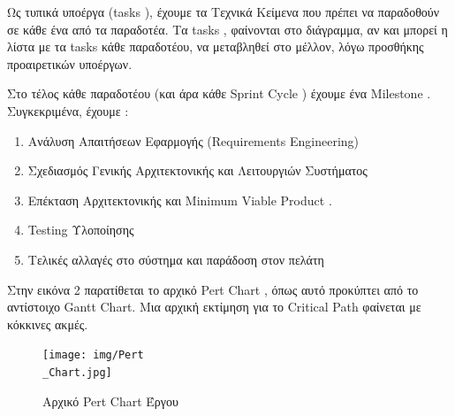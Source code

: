 \documentclass{../ol-softwaremanual}
\begin{document}
		Ως τυπικά υποέργα (\en tasks \gr), έχουμε τα Τεχνικά Κείμενα που πρέπει να παραδοθούν σε κάθε ένα από τα παραδοτέα. Τα \en tasks \gr, φαίνονται στο διάγραμμα, αν και μπορεί η λίστα με τα \en tasks \gr κάθε παραδοτέου, να μεταβληθεί στο μέλλον, λόγω προσθήκης προαιρετικών υποέργων. 
		
		Στο τέλος κάθε παραδοτέου (και άρα κάθε \en Sprint Cycle \gr) έχουμε ένα \en Milestone \gr. Συγκεκριμένα, έχουμε :
		
		\begin{enumerate}
			\item Ανάλυση Απαιτήσεων Εφαρμογής (\en Requirements Engineering\gr)
			\item Σχεδιασμός Γενικής Αρχιτεκτονικής και Λειτουργιών Συστήματος
			\item  Επέκταση Αρχιτεκτονικής και \en Minimum Viable Product \gr.
			\item \en Testing \gr Υλοποίησης
			\item Τελικές αλλαγές στο σύστημα και παράδοση στον πελάτη
		\end{enumerate}
		\newpage
		
		
		\flushleft
		Στην εικόνα 2 παρατίθεται το αρχικό \en Pert Chart \gr, όπως αυτό προκύπτει από το αντίστοιχο \en Gantt Chart\gr. Μια αρχική εκτίμηση για το \en Critical Path \gr φαίνεται με κόκκινες ακμές.
		
		\begin{figure}[htbp!]
			
			\texttt{[image: img/Pert\\\_Chart.jpg]}
						\caption{Αρχικό \en Pert Chart \gr Έργου}
		\end{figure}
	


	
\end{document}
